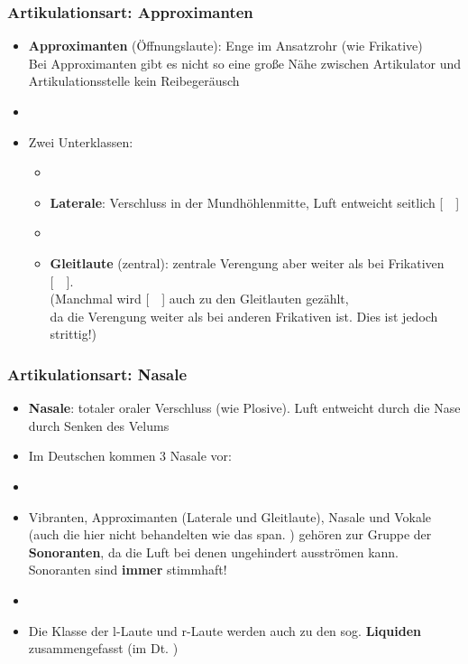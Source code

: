 
\begin{frame}
\frametitle{Artikulationsart: Approximanten}

		\begin{itemize}
			\item \textbf{Approximanten} (Öffnungslaute): Enge im Ansatzrohr (wie Frikative)\\
			Bei Approximanten gibt es nicht so eine große Nähe zwischen Artikulator und Artikulationsstelle \ras kein Reibegeräusch
			\item[]
			\item[] Zwei Unterklassen:
			
			\begin{itemize}
				\item[]
				\item \textbf{Laterale}: Verschluss in der Mundhöhlenmitte, Luft entweicht seitlich [~~]
				\item[]
				\item \textbf{Gleitlaute} (zentral): zentrale Verengung aber weiter als bei Frikativen [~~].\\
				(Manchmal wird [~~] auch zu den Gleitlauten gezählt,\\
                                  da die Verengung weiter als bei anderen Frikativen ist. Dies ist jedoch strittig!)
			\end{itemize}
			
		\end{itemize}	

\end{frame}



\begin{frame}
\frametitle{Artikulationsart: Nasale}
		\begin{itemize}
			\item \textbf{Nasale}: totaler oraler Verschluss (wie Plosive). Luft entweicht durch die Nase durch Senken des Velums\\
			\item[] Im Deutschen kommen 3 Nasale vor: \textipa{[ m, n, N ]}

		\item[]
		\item Vibranten, Approximanten (Laterale und Gleitlaute), Nasale und Vokale (auch die hier nicht behandelten  wie das span. \textipa{[~R~]}) gehören zur Gruppe der \textbf{Sonoranten}, da die Luft bei denen ungehindert ausströmen kann. Sonoranten sind \textbf{immer} stimmhaft!
		\item[]
		\item Die Klasse der l-Laute und r-Laute werden auch zu den sog. \textbf{Liquiden} zusammengefasst (im Dt. \textipa{[ l, r, \textscr ]})
	\end{itemize}
	
\end{frame}


